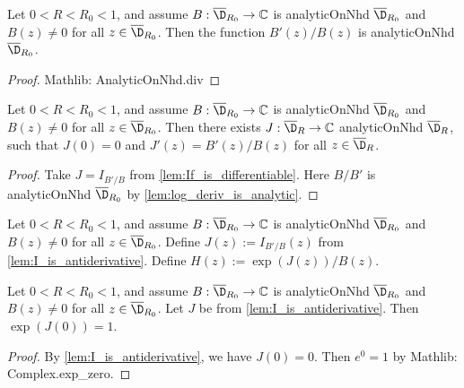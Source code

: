 \begin{lemma}\label{lem:log_deriv_is_analytic}
\leanok
Let $0<R<R_0<1$, and assume $B:\overline{\D}_{R_0}\to\mathbb{C}$ is analyticOnNhd $\overline{\D}_{R_0}$ and $B(z) \ne 0$ for all $z \in \overline{\D}_{R_0}$. Then the function $B'(z)/B(z)$ is analyticOnNhd $\overline{\D}_{R_0}$.
\end{lemma}
\begin{proof}
\leanok
Mathlib: AnalyticOnNhd.div
\end{proof}

\begin{lemma}\label{lem:I_is_antiderivative}
\leanok
{}
Let $0<R<R_0<1$, and assume $B:\overline{\D}_{R_0}\to\mathbb{C}$ is analyticOnNhd $\overline{\D}_{R_0}$ and $B(z) \ne 0$ for all $z \in \overline{\D}_{R_0}$. Then there exists $J: \overline{\D}_R\to\mathbb{C}$ analyticOnNhd $\overline{\D}_{R}$, such that $J(0)=0$ and $J'(z) = B'(z)/B(z)$ for all $z \in \overline{\D}_R$.
\end{lemma}
\begin{proof}
\leanok
Take $J=I_{B'/B}$ from \cref{lem:If_is_differentiable}. Here $B/B'$ is analyticOnNhd $\overline{\D}_{R_0}$ by \cref{lem:log_deriv_is_analytic}.
\end{proof}


\begin{definition}\label{def:H_auxiliary} \leanok
{}
Let $0<R<R_0<1$, and assume $B:\overline{\D}_{R_0}\to\mathbb{C}$ is analyticOnNhd $\overline{\D}_{R_0}$ and $B(z) \ne 0$ for all $z \in \overline{\D}_{R_0}$. Define $J(z) := I_{B'/B}(z)$ from \cref{lem:I_is_antiderivative}.
Define $H(z) := \exp(J(z))/B(z)$.
\end{definition}

\begin{lemma}\label{lem:exp_I_at_zero}
\leanok
{}
Let $0<R<R_0<1$, and assume $B:\overline{\D}_{R_0}\to\mathbb{C}$ is analyticOnNhd $\overline{\D}_{R_0}$ and $B(z) \ne 0$ for all $z \in \overline{\D}_{R_0}$. Let $J$ be from \cref{lem:I_is_antiderivative}. Then $\exp(J(0)) = 1$.
\end{lemma}
\begin{proof}
\leanok
By \cref{lem:I_is_antiderivative}, we have $J(0)=0$. Then $e^0=1$ by Mathlib: Complex.exp\_zero.
\end{proof}

